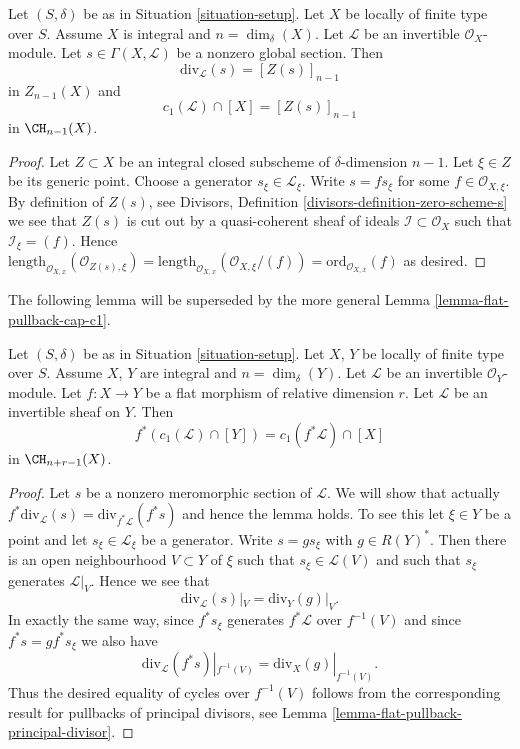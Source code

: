 \begin{lemma}
\label{lemma-compute-c1}
Let $(S, \delta)$ be as in Situation \ref{situation-setup}.
Let $X$ be locally of finite type over $S$. Assume $X$ is
integral and $n = \dim_\delta(X)$.
Let $\mathcal{L}$ be an invertible $\mathcal{O}_X$-module.
Let $s \in \Gamma(X, \mathcal{L})$ be a nonzero global section.
Then
$$
\text{div}_\mathcal{L}(s) = [Z(s)]_{n - 1}
$$
in $Z_{n - 1}(X)$ and
$$
c_1(\mathcal{L}) \cap [X] = [Z(s)]_{n - 1}
$$
in $\CH_{n - 1}(X)$.
\end{lemma}

\begin{proof}
Let $Z \subset X$ be an integral closed subscheme of
$\delta$-dimension $n - 1$. Let $\xi \in Z$ be its generic
point. Choose a generator $s_\xi \in \mathcal{L}_\xi$.
Write $s = fs_\xi$ for some $f \in \mathcal{O}_{X, \xi}$.
By definition of $Z(s)$, see
Divisors, Definition \ref{divisors-definition-zero-scheme-s}
we see that $Z(s)$ is cut out by a quasi-coherent
sheaf of ideals $\mathcal{I} \subset \mathcal{O}_X$ such
that $\mathcal{I}_\xi = (f)$. Hence
$\text{length}_{\mathcal{O}_{X, x}}(\mathcal{O}_{Z(s), \xi})
=
\text{length}_{\mathcal{O}_{X, x}}(\mathcal{O}_{X, \xi}/(f))
=
\text{ord}_{\mathcal{O}_{X, x}}(f)$ as desired.
\end{proof}

\noindent
The following lemma will be superseded by the more general
Lemma \ref{lemma-flat-pullback-cap-c1}.

\begin{lemma}
\label{lemma-flat-pullback-divisor-invertible-sheaf}
Let $(S, \delta)$ be as in Situation \ref{situation-setup}.
Let $X$, $Y$ be locally of finite type over $S$. Assume $X$, $Y$
are integral and $n = \dim_\delta(Y)$.
Let $\mathcal{L}$ be an invertible $\mathcal{O}_Y$-module.
Let $f : X \to Y$ be a flat morphism of relative dimension $r$.
Let $\mathcal{L}$ be an invertible sheaf on $Y$. Then
$$
f^*(c_1(\mathcal{L}) \cap [Y]) = c_1(f^*\mathcal{L}) \cap [X]
$$
in $\CH_{n + r - 1}(X)$.
\end{lemma}

\begin{proof}
Let $s$ be a nonzero meromorphic section of $\mathcal{L}$.
We will show that actually
$f^*\text{div}_\mathcal{L}(s) = \text{div}_{f^*\mathcal{L}}(f^*s)$
and hence the lemma holds.
To see this let $\xi \in Y$ be a point and let $s_\xi \in \mathcal{L}_\xi$
be a generator. Write $s = gs_\xi$ with $g \in R(Y)^*$.
Then there is an open neighbourhood $V \subset Y$ of $\xi$
such that $s_\xi \in \mathcal{L}(V)$ and such that $s_\xi$ generates
$\mathcal{L}|_V$. Hence we see that
$$
\text{div}_\mathcal{L}(s)|_V = \text{div}_Y(g)|_V.
$$
In exactly the same way, since $f^*s_\xi$ generates $f^*\mathcal{L}$
over $f^{-1}(V)$ and since $f^*s = g f^*s_\xi$ we also
have
$$
\text{div}_\mathcal{L}(f^*s)|_{f^{-1}(V)}
=
\text{div}_X(g)|_{f^{-1}(V)}.
$$
Thus the desired equality of cycles over $f^{-1}(V)$ follows from the
corresponding result for pullbacks of principal divisors, see
Lemma \ref{lemma-flat-pullback-principal-divisor}.
\end{proof}




